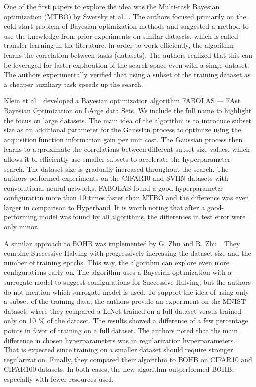 One of the first papers to explore the idea was the Multi-task Bayesian optimization (MTBO) by Swersky et al.~\cite{swersky2013multi}. The authors focused primarily on the cold start problem of Bayesian optimization methods and suggested a method to use the knowledge from prior experiments on similar datasets, which is called transfer learning in the literature. In order to work efficiently, the algorithm learns the correlation between tasks (datasets). The authors realized that this can be leveraged for faster exploration of the search space even with a single dataset. The authors experimentally verified that using a subset of the training dataset as a cheaper auxiliary task speeds up the search.

Klein et al.~\cite{klein2017fast} developed a Bayesian optimization algorithm FABOLAS --- FAst Bayesian Optimization on LArge data Sets. We include the full name to highlight the focus on large datasets. The main idea of the algorithm is to introduce subset size as an additional parameter for the Gaussian process to optimize using the acquisition function information gain per unit cost. The Gaussian process then learns to approximate the correlations between different subset size values, which allows it to efficiently use smaller subsets to accelerate the hyperparameter search. The dataset size is gradually increased throughout the search. The authors performed experiments on the CIFAR10 and SVHN datasets with convolutional neural networks. FABOLAS found a good hyperparameter configuration more than 10 times faster than MTBO and the difference was even larger in comparison to Hyperband. It is worth noting that after a good-performing model was found by all algorithms, the differences in test error were only minor.


A similar approach to BOHB was implemented by G. Zhu and R. Zhu~\cite{zhu2020accelerating}. They combine Successive Halving with progressively increasing the dataset size and the number of training epochs. This way, the algorithm can explore even more configurations early on. The algorithm uses a Bayesian optimization with a surrogate model to suggest configurations for Successive Halving, but the authors do not mention which surrogate model is used. To support the idea of using only a subset of the training data, the authors provide an experiment on the MNIST dataset, where they compared a LeNet trained on a full dataset versus trained only on \SI{10}{\percent} of the dataset. The results showed a difference of a few percentage points in favor of training on a full dataset. The authors noted that the main difference in chosen hyperparameters was in regularization hyperparameters. That is expected since training on a smaller dataset should require stronger regularization. Finally, they compared their algorithm to BOHB on CIFAR10 and CIFAR100 datasets. In both cases, the new algorithm outperformed BOHB, especially with fewer resources used.

